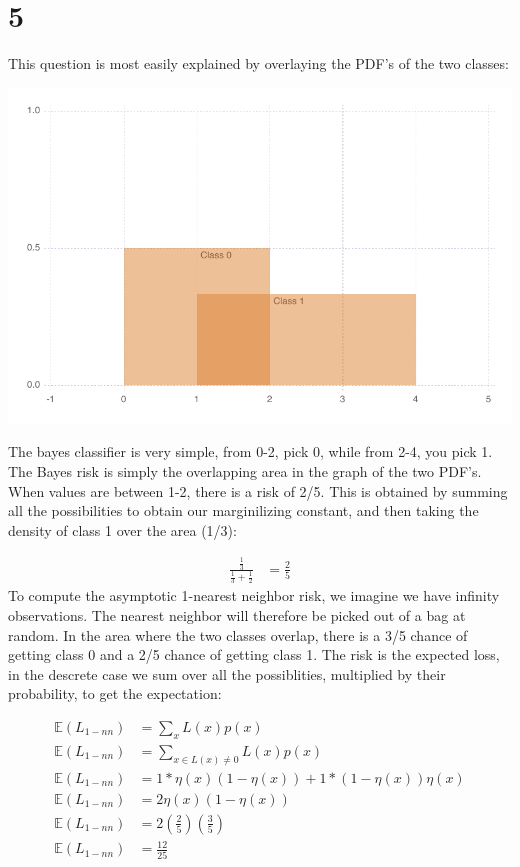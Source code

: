 \documentclass[a4paper,12pt]{article}
\begin{document}
\section*{5}
This question is most easily explained by overlaying the PDF's of the two classes:

\includegraphics[width=\linewidth]{figures/two_1_1.pdf}



The bayes classifier is very simple, from 0-2, pick 0, while from 2-4, you pick 1. The Bayes risk is simply the overlapping area in the graph of the two PDF's. When values are between 1-2, there is a risk of 2/5. This is obtained by summing all the possibilities to obtain our marginilizing constant, and then taking the density of class 1 over the area (1/3):

\begin{align*}
\frac{\frac{1}{3}}{\frac{1}{3} + \frac{1}{2}} &= \frac{2}{5}
\end{align*}
%
To compute the asymptotic 1-nearest neighbor risk, we imagine we have infinity observations. The nearest neighbor will therefore be picked out of a bag at random. In the area where the two classes overlap, there is a 3/5 chance of getting class 0 and a 2/5 chance of getting class 1. The risk is the expected loss, in the descrete case we sum over all the possiblities, multiplied by their probability, to get the expectation:

\begin{align*}
\mathbb{E}(L_{1-nn}) &= \sum_x L(x)p(x) \\
\mathbb{E}(L_{1-nn}) &= \sum_{x \in L(x) \neq 0 } L(x)p(x) \\
\mathbb{E}(L_{1-nn}) &= 1*\eta(x)(1-\eta(x)) + 1*(1-\eta(x))\eta(x) \\
\mathbb{E}(L_{1-nn}) &= 2\eta(x)(1-\eta(x)) \\
\mathbb{E}(L_{1-nn}) &= 2(\frac{2}{5})(\frac{3}{5}) \\
\mathbb{E}(L_{1-nn}) &= \frac{12}{25}
\end{align*}
\end{document}
